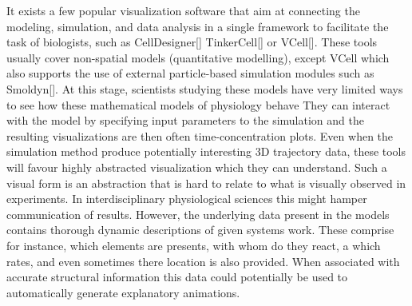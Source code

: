 

It exists a few popular visualization software that aim at connecting the modeling, simulation, and data analysis in a single framework to facilitate the task of biologists, such as CellDesigner[] TinkerCell[] or VCell[].
These tools usually cover non-spatial models (quantitative modelling), except VCell which also supports the use of external particle-based simulation modules such as Smoldyn[].
At this stage, scientists studying these models have very limited ways to see how these mathematical models of physiology behave
They can interact with the model by specifying input parameters to the simulation and the resulting visualizations are then often time-concentration plots.
Even when the simulation method produce potentially interesting 3D trajectory data, these tools will favour highly abstracted visualization which they can understand.
Such a visual form is an abstraction that is hard to relate to what is visually observed in experiments. 
In interdisciplinary physiological sciences this might hamper communication of results. 
However, the underlying data present in the models contains thorough dynamic descriptions of given systems work.
These comprise for instance, which elements are presents, with whom do they react, a which rates, and even sometimes there location is also provided.
When associated with accurate structural information this data could potentially be used to automatically generate explanatory animations.

